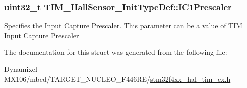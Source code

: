 \subsubsection[{\texorpdfstring{I\+C1\+Prescaler}{IC1Prescaler}}]{\setlength{\rightskip}{0pt plus 5cm}uint32\+\_\+t T\+I\+M\+\_\+\+Hall\+Sensor\+\_\+\+Init\+Type\+Def\+::\+I\+C1\+Prescaler}\hypertarget{struct_t_i_m___hall_sensor___init_type_def_ac6c54e891cbe5afec92676219978209e}{}\label{struct_t_i_m___hall_sensor___init_type_def_ac6c54e891cbe5afec92676219978209e}
Specifies the Input Capture Prescaler. This parameter can be a value of \hyperlink{group___t_i_m___input___capture___prescaler}{T\+IM Input Capture Prescaler} 

The documentation for this struct was generated from the following file\+:\begin{DoxyCompactItemize}
\item 
Dynamixel-\/\+M\+X106/mbed/\+T\+A\+R\+G\+E\+T\+\_\+\+N\+U\+C\+L\+E\+O\+\_\+\+F446\+R\+E/\hyperlink{stm32f4xx__hal__tim__ex_8h}{stm32f4xx\+\_\+hal\+\_\+tim\+\_\+ex.\+h}\end{DoxyCompactItemize}
